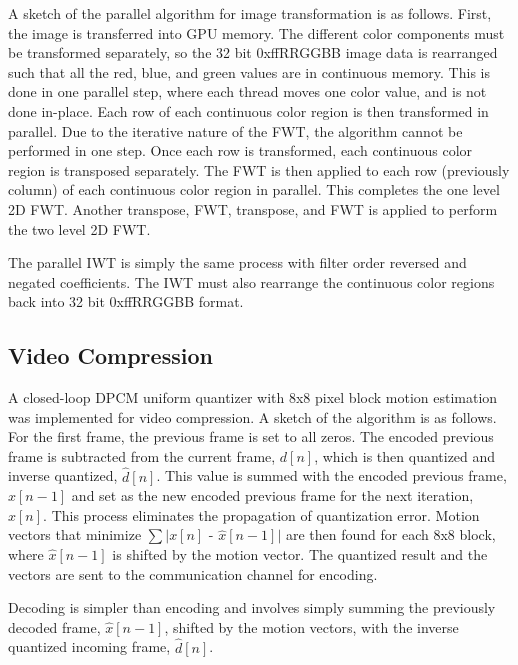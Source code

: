 \documentclass[10pt,twocolumn,twoside]{IEEEtran}
\begin{document}
A sketch of the parallel algorithm for image transformation is as follows. First, the image is transferred 
into GPU memory. The different color components must be transformed separately, so the 32 bit 0xffRRGGBB image 
data is rearranged such that all the red, blue, and green values are in continuous memory. This is done in one 
parallel step, where each thread moves one color value, and is not done in-place. Each row of each continuous 
color region is then transformed in parallel. Due to the iterative nature of the FWT, the algorithm cannot be 
performed in one step. Once each row is transformed, each continuous color region is transposed separately. 
The FWT is then applied to each row (previously column) of each continuous color region in parallel. This 
completes the one level 2D FWT. Another transpose, FWT, transpose, and FWT is applied to perform the two level 
2D FWT.

The parallel IWT is simply the same process with filter order reversed and negated coefficients. The IWT must 
also rearrange the continuous color regions back into 32 bit 0xffRRGGBB format.

\subsection{Video Compression}
A closed-loop DPCM uniform quantizer with 8x8 pixel block motion estimation was implemented for video 
compression. A sketch of the algorithm is as follows. For the first frame, the previous frame is set to all 
zeros. The encoded previous frame is subtracted from the current frame, $d[n]$, which is then quantized and 
inverse quantized, $\hat{d}[n]$. This value is summed with the encoded previous frame, $\hat{x}[n-1]$ and set 
as the new encoded previous frame for the next iteration, $\hat{x}[n]$.\cite{transformation} This process 
eliminates the propagation of quantization error. Motion vectors that minimize $\sum$$\mid$$x[n]$ - $\hat{x}
[n-1]$$\mid$ are then found for each 8x8 block, where $\hat{x}[n-1]$ is shifted by the motion vector.\cite
{video-coding} The quantized result and the vectors are sent to the communication channel for encoding.

Decoding is simpler than encoding and involves simply summing the previously decoded frame, $\hat{x}[n-1]$, 
shifted by the motion vectors, with the inverse quantized incoming frame, $\hat{d}[n]$.
\end{document}

